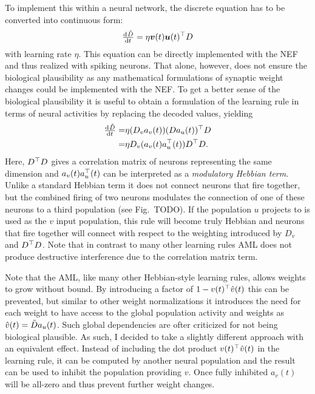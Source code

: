 To implement this within a neural network, the discrete equation has to be converted into continuous form:
\begin{equation}
    \od{\tilde{\mat D}}{t} = \eta \vc v(t) \vc u(t)\Tr \mat D
\end{equation}
with learning rate $\eta$.
This equation can be directly implemented with the NEF and thus realized with spiking neurons.
That alone, however, does not ensure the biological plausibility as any mathematical formulations of synaptic weight changes could be implemented with the NEF\@.
To get a better sense of the biological plausibility it is useful to obtain a formulation of the learning rule in terms of neural activities by replacing the decoded values, yielding
\begin{eqnarray}
    \od{\tilde{\mat D}}{t} =& \eta (D_v a_v(t)) (D a_u(t))\Tr D \\
    =& \eta D_v (a_v(t) a_u\Tr(t)) D\Tr D \text{.}
\end{eqnarray}
Here, $D^{\top} D$ gives a correlation matrix of neurons representing the same dimension and $a_v(t) a_u^{\top}(t)$ can be interpreted as a \emph{modulatory Hebbian term}.
Unlike a standard Hebbian term it does not connect neurons that fire together, but the combined firing of two neurons modulates the connection of one of these neurons to a third population (see Fig.~TODO).
If the population $u$ projects to is used as the $v$ input population, this rule will become truly Hebbian and neurons that fire together will connect with respect to the weighting introduced by $D_v$ and $D^{\top} D$.
Note that in contrast to many other learning rules AML does not produce destructive interference due to the correlation matrix term.

Note that the AML, like many other Hebbian-style learning rules, allows weights to grow without bound.
By introducing a factor of $1 - v(t)^{\top} \hat{v}(t)$ this can be prevented, but similar to other weight normalizations it introduces the need for each weight to have access to the global population activity and weights as $\hat{v}(t) = \tilde{D} a_u(t)$.
Such global dependencies are ofter criticized for not being biological plausible.
As such, I decided to take a slightly different approach with an equivalent effect.
Instead of including the dot product $v(t)^{\top} \hat{v}(t)$ in the learning rule, it can be computed by another neural population and the result can be used to inhibit the population providing $v$.
Once fully inhibited $a_v(t)$ will be all-zero and thus prevent further weight changes.
